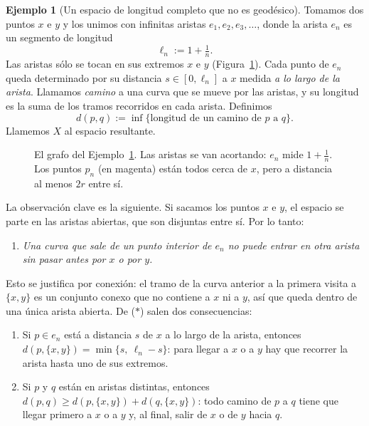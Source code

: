 \documentclass[12pt, a4paper]{amsart}
\theoremstyle{definition}
\newtheorem{ejemplo}[teorema]{Ejemplo}
\theoremstyle{remark}
\begin{document}
\begin{ejemplo}[Un espacio de longitud completo que no es geodésico]\label{ej:grafo}
Tomamos dos puntos $x$ e $y$ y los unimos con infinitas aristas $e_1,e_2,e_3,\dots$, donde la arista $e_n$ es un segmento de longitud
\[
\ell_n:=1+\tfrac1n.
\]
Las aristas sólo se tocan en sus extremos $x$ e $y$ (Figura~\ref{fig:grafo}). Cada punto de $e_n$ queda determinado por su distancia $s\in[0,\ell_n]$ a $x$ medida \emph{a lo largo de la arista}. Llamamos \emph{camino} a una curva que se mueve por las aristas, y su longitud es la suma de los tramos recorridos en cada arista. Definimos
\[
d(p,q):=\inf\{\text{longitud de un camino de } p \text{ a } q\}.
\]
Llamemos $X$ al espacio resultante.

\begin{figure}[htbp]
\centering
{}
\caption{El grafo del Ejemplo~\ref{ej:grafo}. Las aristas se van acortando: $e_n$ mide $1+\frac1n$. Los puntos $p_n$ (en magenta) están todos cerca de $x$, pero a distancia al menos $2r$ entre sí.}
\label{fig:grafo}
\end{figure}

La observación clave es la siguiente. Si sacamos los puntos $x$ e $y$, el espacio se parte en las aristas abiertas, que son disjuntas entre sí. Por lo tanto:

\begin{enumerate}[label=($\ast$)]
\item \emph{Una curva que sale de un punto interior de $e_n$ no puede entrar en otra arista sin pasar antes por $x$ o por $y$.}
\end{enumerate}

Esto se justifica por conexión: el tramo de la curva anterior a la primera visita a $\{x,y\}$ es un conjunto conexo que no contiene a $x$ ni a $y$, así que queda dentro de una única arista abierta. De ($\ast$) salen dos consecuencias:
\begin{enumerate}[label=(\roman*)]
\item Si $p\in e_n$ está a distancia $s$ de $x$ a lo largo de la arista, entonces $d(p,\{x,y\})=\min\{s,\ \ell_n-s\}$: para llegar a $x$ o a $y$ hay que recorrer la arista hasta uno de sus extremos.
\item Si $p$ y $q$ están en aristas distintas, entonces $d(p,q)\ge d(p,\{x,y\})+d(q,\{x,y\})$: todo camino de $p$ a $q$ tiene que llegar primero a $x$ o a $y$ y, al final, salir de $x$ o de $y$ hacia $q$.
\end{enumerate}


\end{ejemplo}
\end{document}
